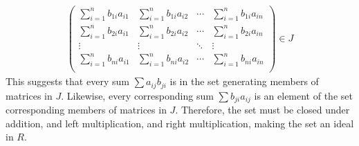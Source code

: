 \begin{problem}
\begin{enumalph}
\begin{Answer}
\begin{align*}
\begin{pmatrix}
          \sum_{i=1}^n b_{1i}a_{i1} & \sum_{i=1}^n b_{1i}a_{i2} & \cdots & \sum_{i=1}^n b_{1i}a_{in} \\
          \sum_{i=1}^n b_{2i}a_{i1} & \sum_{i=1}^n b_{2i}a_{i2} & \cdots & \sum_{i=1}^n b_{2i}a_{in} \\
          \vdots & \vdots & \ddots & \vdots \\
          \sum_{i=1}^n b_{ni}a_{i1} & \sum_{i=1}^n b_{ni}a_{i2} & \cdots & \sum_{i=1}^n b_{ni}a_{in} \\
        \end{pmatrix} \in J
      \end{align*}
      This suggests that every sum $\sum a_{ij}b_{ji}$ is in the set
      generating members of matrices in $J$.
      Likewise, every corresponding sum $\sum b_{ji}a_{ij}$ is an element
      of the set corresponding members of matrices in $J$.
      Therefore, the set must be closed under addition, and left multiplication,
      and right multiplication, making the set an ideal in $R$.
    \end{Answer}
  \end{enumalph}
\end{problem}
